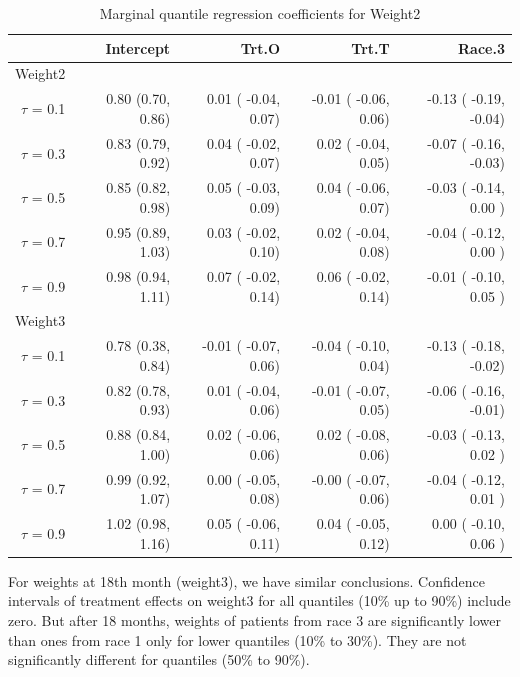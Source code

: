\documentclass[12pt]{article}
\begin{document}
\begin{table}[ht]
  \renewcommand{\arraystretch}{1.3}
  \begin{center}
    \caption{Marginal quantile regression coefficients for
      Weight2}\label{tab:w2}
    \vspace{10pt}
    \begin{tabular}{rrrrr}
      \toprule
      & Intercept         & Trt.O                & Trt.T                & Race.3                \\ 
      \hline
      Weight2      &                   &                      &                      &                       \\ 
      $\tau$ = 0.1 & 0.80 (0.70, 0.86) & 0.01  ( -0.04, 0.07) & -0.01 ( -0.06, 0.06) & -0.13 ( -0.19, -0.04) \\ 
      $\tau$ = 0.3 & 0.83 (0.79, 0.92) & 0.04  ( -0.02, 0.07) & 0.02  ( -0.04, 0.05) & -0.07 ( -0.16, -0.03) \\ 
      $\tau$ = 0.5 & 0.85 (0.82, 0.98) & 0.05  ( -0.03, 0.09) & 0.04  ( -0.06, 0.07) & -0.03 ( -0.14, 0.00 ) \\ 
      $\tau$ = 0.7 & 0.95 (0.89, 1.03) & 0.03  ( -0.02, 0.10) & 0.02  ( -0.04, 0.08) & -0.04 ( -0.12, 0.00 ) \\ 
      $\tau$ = 0.9 & 0.98 (0.94, 1.11) & 0.07  ( -0.02, 0.14) & 0.06  ( -0.02, 0.14) & -0.01 ( -0.10, 0.05 ) \\
      Weight3      &                   &                      &                      &                       \\ 
      $\tau$ = 0.1 & 0.78 (0.38, 0.84) & -0.01 ( -0.07, 0.06) & -0.04 ( -0.10, 0.04) & -0.13 ( -0.18, -0.02) \\ 
      $\tau$ = 0.3 & 0.82 (0.78, 0.93) & 0.01  ( -0.04, 0.06) & -0.01 ( -0.07, 0.05) & -0.06 ( -0.16, -0.01) \\ 
      $\tau$ = 0.5 & 0.88 (0.84, 1.00) & 0.02  ( -0.06, 0.06) & 0.02  ( -0.08, 0.06) & -0.03 ( -0.13, 0.02 ) \\ 
      $\tau$ = 0.7 & 0.99 (0.92, 1.07) & 0.00  ( -0.05, 0.08) & -0.00 ( -0.07, 0.06) & -0.04 ( -0.12, 0.01 ) \\ 
      $\tau$ = 0.9 & 1.02 (0.98, 1.16) & 0.05  ( -0.06, 0.11) & 0.04  ( -0.05, 0.12) & 0.00  ( -0.10, 0.06 ) \\ 
      \bottomrule
    \end{tabular}
  \end{center}
\end{table}

For weights at 18th month (weight3), we have similar
conclusions. Confidence intervals of treatment effects on weight3 for
all quantiles (10\% up to 90\%) include zero. But after 18 months,
weights of patients from race 3 are significantly lower than ones from
race 1 only for lower quantiles (10\% to 30\%). They are not
significantly different for quantiles (50\% to 90\%).
\end{document}
